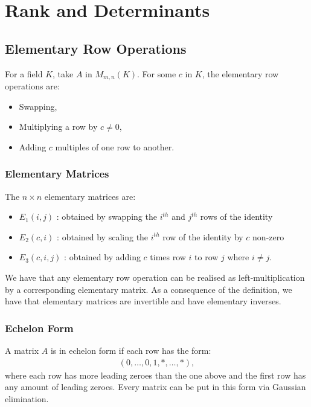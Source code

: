 \section{Rank and Determinants}

\subsection{Elementary Row Operations}

For a field $K$, take $A$ in $M_{m,n}(K)$. For some
$c$ in $K$, the elementary
row operations are: \begin{itemize}
    \item Swapping,
    \item Multiplying a row by $c \neq 0$,
    \item Adding $c$ multiples of one row to another.
\end{itemize}

\subsubsection{Elementary Matrices}

The $n \times n$ elementary matrices are: \begin{itemize}
  \item $E_1(i, j)$ : obtained by swapping the $i^{th}$ and $j^{th}$ rows
  of the identity
  \item $E_2(c, i)$ : obtained by scaling the $i^{th}$ row of the identity
  by $c$ non-zero
  \item $E_3(c, i, j)$ : obtained by adding $c$ times row $i$ to row $j$
  where $i \neq j$.
\end{itemize} We have that any elementary row operation can be realised as
left-multiplication by a corresponding elementary matrix. As a consequence
of the definition, we have that elementary matrices are invertible and
have elementary inverses.

\subsubsection{Echelon Form}

A matrix $A$ is in echelon form if each row has the form: \begin{gather*}
  (0, \ldots, 0, 1, *, \ldots, *),
\end{gather*} where each row has more leading zeroes than the one above and
the first row has any amount of leading zeroes. Every matrix can be put in
this form via Gaussian elimination.

